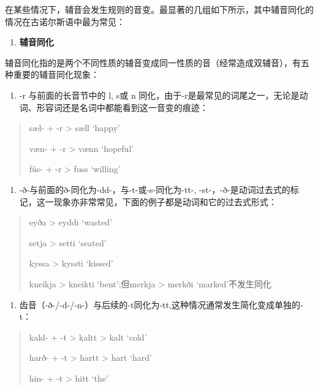 在某些情况下，辅音会发生规则的音变。最显著的几组如下所示，其中辅音同化的情况在古诺尔斯语中最为常见：

\begin{enumerate}
\def\labelenumi{\Alph{enumi}.}
\item
  \label{_Ref117517666}{}\textbf{辅音同化}
\end{enumerate}

辅音同化指的是两个不同性质的辅音变成同一性质的音（经常造成双辅音），有五种重要的辅音同化现象：

\begin{enumerate}
\def\labelenumi{(\alph{enumi})}
\item
  \label{_Ref117517668}{}-r 与前面的长音节中的 l, s或 n
  同化，由于-r是最常见的词尾之一，无论是动词、形容词还是名词中都能看到这一音变的痕迹：
\end{enumerate}

\begin{quote}
sæl- + -r \textgreater{} sæll `happy'

væn- + -r \textgreater{} vænn `hopeful'

fús- + -r \textgreater{} fuss `willing'
\end{quote}

\begin{enumerate}
\def\labelenumi{(\alph{enumi})}
\setcounter{enumi}{1}
\item
  -ð-与前面的ð-同化为-dd-，与-t-或-s-同化为-tt-,
  -st-，-ð-是动词过去式的标记，这一现象亦非常常见，下面的例子都是动词和它的过去式形式：
\end{enumerate}

\begin{quote}
eyða \textgreater{} eyddi `wasted'

setja \textgreater{} setti `seated'

kyssa \textgreater{} kyssti `kissed'

kneikja \textgreater{} kneikti `bent';但merkja \textgreater{} merkði
`marked'不发生同化
\end{quote}

\begin{enumerate}
\def\labelenumi{(\alph{enumi})}
\setcounter{enumi}{2}
\item
  齿音（-ð-/-d-/-n-）与后续的-t同化为-tt,这种情况通常发生简化变成单独的-t：
\end{enumerate}

\begin{quote}
kald- + -t \textgreater{} kaltt \textgreater{} kalt `cold'

harð- + -t \textgreater{} hartt \textgreater{} hart `hard'

hin- + -t \textgreater{} hitt `the'
\end{quote}


